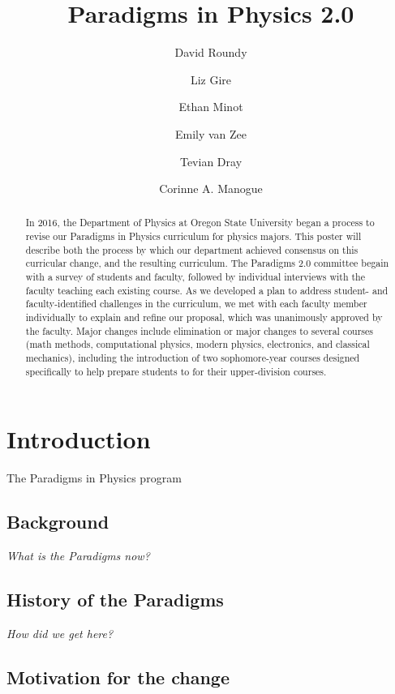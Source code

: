 \documentclass[english,aps,pra,reprint,noshowpacs,superscriptaddress]{revtex4-1}
\begin{document}
\title{Paradigms in Physics 2.0}
\author{David Roundy}
\author{Liz Gire}
\author{Ethan Minot}
\author{Emily van Zee}
\author{Tevian Dray}
\author{Corinne A. Manogue}


\begin{abstract}
In 2016, the Department of Physics at Oregon State University began a
process to revise our Paradigms in Physics curriculum for physics
majors.  This poster will describe both the process by which our
department achieved consensus on this curricular change, and the
resulting curriculum.  The Paradigms 2.0 committee begain with a
survey of students and faculty, followed by individual interviews with
the faculty teaching each existing course.  As we developed a plan to
address student- and faculty-identified challenges in the curriculum,
we met with each faculty member individually to explain and refine our
proposal, which was unanimously approved by the faculty.  Major
changes include elimination or major changes to several courses (math
methods, computational physics, modern physics, electronics, and
classical mechanics), including the introduction of two sophomore-year
courses designed specifically to help prepare students to for their
upper-division courses.
\end{abstract}

\maketitle

\section{Introduction}
The Paradigms in Physics program

\subsection{Background}
\emph{What is the Paradigms now?}
\subsection{History of the Paradigms}
\emph{How did we get here?~\cite{manogue2001paradigms}}
\subsection{Motivation for the change}
\end{document}
